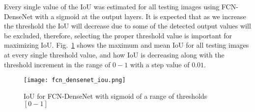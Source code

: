 	Every single value of the IoU was estimated for all testing images using FCN-DenseNet with a sigmoid at the output layers.
	It is expected that as we increase the threshold the IoU will decrease due to some of the detected output values will be excluded, therefore, selecting the proper threshold value is important for maximizing IoU. Fig.~\ref{fig:iou_fcn} shows the maximum and mean IoU for all testing images at every single threshold value, and how IoU is decreasing along with the threshold increment in the range of \(0-1\) with a step value of \(0.01\).
	\begin{figure}[!h] 
		\centering
		\texttt{[image: fcn\_densenet\_iou.png]}
		\centering
		\caption{IoU for FCN-DenseNet with sigmoid of a range of thresholds \([0-1]\)} 
		\label{fig:iou_fcn}
	\end{figure}
	
